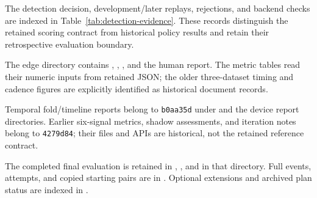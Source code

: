 The detection decision, development/later replays, rejections, and backend
checks are indexed in Table~\ref{tab:detection-evidence}.
These records distinguish the retained scoring contract from historical policy
results and retain their retrospective evaluation boundary.

The edge directory contains ,
, , and the human
 report. The metric tables read their numeric inputs
from retained JSON; the older three-dataset timing and cadence figures are
explicitly identified as historical document records.

Temporal fold/timeline reports belong to \texttt{b0aa35d} under
 and the device report directories. Earlier
six-signal metrics, shadow assessments, and iteration notes belong to
\texttt{4279d84}; their files and APIs are historical, not the retained
reference contract.

The completed final evaluation is retained in
,
, and  in that directory. Full
events, attempts, and copied starting pairs are in
. Optional extensions and archived plan status
are indexed in .
